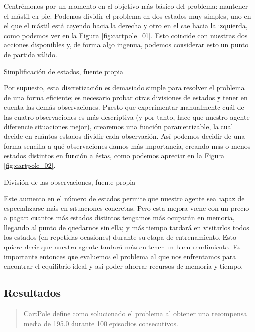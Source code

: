 Centrémonos por un momento en el objetivo más básico del problema: mantener el mástil en pie. Podemos dividir el problema en dos estados muy simples, uno en el que el mástil está cayendo hacia la derecha y otro en el cae hacia la izquierda, como podemos ver en la Figura \ref{fig:cartpole_01}. Esto coincide con nuestras dos acciones disponibles y, de forma algo ingenua, podemos considerar esto un punto de partida válido.

%
       {Simplificación de estados, fuente propia}

Por supuesto, esta discretización es demasiado simple para resolver el problema de una forma eficiente; es necesario probar otras divisiones de estados y tener en cuenta las demás observaciones. Puesto que experimentar manualmente cuál de las cuatro observaciones es más descriptiva (y por tanto, hace que nuestro agente diferencie situaciones mejor), crearemos una función parametrizable, la cual decide en cuántos estados dividir cada observación. Así podemos decidir de una forma sencilla a qué observaciones damos más importancia, creando más o menos estados distintos en función a éstas, como podemos apreciar en la Figura \ref{fig:cartpole_02}.

%
       {División de las observaciones, fuente propia}

Este aumento en el número de estados permite que nuestro agente sea capaz de especializarse más en situaciones concretas. Pero esta mejora viene con un precio a pagar: cuantos más estados distintos tengamos más ocuparán en memoria, llegando al punto de quedarnos sin ella; y más tiempo tardará en visitarlos todos los estados (en repetidas ocasiones) durante su etapa de entrenamiento. Esto quiere decir que nuestro agente tardará más en tener un buen rendimiento. Es importante entonces que evaluemos el problema al que nos enfrentamos para encontrar el equilibrio ideal y así poder ahorrar recursos de memoria y tiempo.


\subsection{Resultados}

\begin{quote}
    CartPole define como solucionado el problema al obtener una recompensa media de 195.0 durante 100 episodios consecutivos.
\end{quote}

